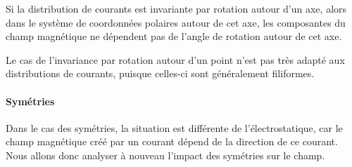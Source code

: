 \documentclass[11pt,fleqn]{book} %
\begin{document}
\begin{proposition}
    Si la distribution de courants est invariante par rotation autour d'un axe, alors dans le système de coordonnées polaires autour de cet axe, les composantes du champ magnétique ne dépendent pas de l'angle de rotation autour de cet axe.
\end{proposition}

Le cas de l'invariance par rotation autour d'un point n'est pas très adapté aux distributions de courants, puisque celles-ci sont généralement filiformes.

\paragraph{Symétries}

Dans le cas des symétries, la situation est différente de l'électrostatique, car le champ magnétique créé par un courant dépend de la direction de ce courant. Nous allons donc analyser à nouveau l'impact des symétries sur le champ.
\end{document}
